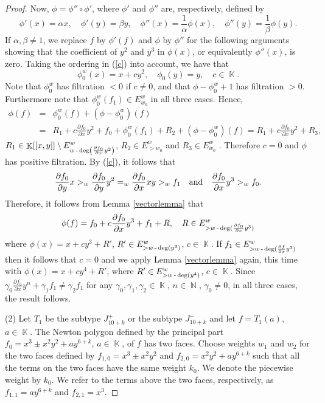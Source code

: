 \documentclass[noend]{amsproc}
\theoremstyle{definition}
\DeclareMathOperator{\N}{\mathbb{N}}
\DeclareMathOperator{\K}{\mathbb{K}}
\DeclareMathOperator{\dash}{\textnormal{-}}
\begin{document}
\begin{proof}
Now, $\phi=\phi''\circ\phi'$, where $\phi'$ and $\phi''$ are, respectively, defined by
\[\phi'(x)=\alpha x,\quad \phi'(y)=\beta y, \quad \phi''(x)=\frac{1}{\alpha}\phi(x), \quad\phi''(y)=\frac{1}{\beta}\phi(y).\]
If $\alpha,\beta\neq 1$, we replace $f$ by $\phi'(f)$ and $\phi$ by $\phi''$ for the following arguments showing that the coefficient of $y^2$ and $y^3$ in $\phi(x)$, or equivalently $\phi''(x)$, is zero. Taking the ordering in (\ref{c}) into account, we have that \[\phi_0^w(x)=x+cy^2, \quad\phi_0(y)=y,\quad c\in\K.\] Note that $\phi^w_0$ has filtration $<0$ if $c\neq 0$, and that $\phi-\phi^w_0+1$ has filtration $>0$. Furthermore note that $\phi_0^w(f_1)\in E_{w_0}^w$ in all three cases. Hence,
\begin{eqnarray*}
\phi(f)&=&\phi_0^w(f)+(\phi-\phi^w_0)(f)\\
&=& R_1+c\frac{\partial f_0}{\partial x}y^2+f_0+\phi^w_0(f_1)+R_2 +(\phi-\phi^w_0)(f)=R_1+c\frac{\partial f_0}{\partial x}y^2+R_3,
\end{eqnarray*} 
$R_1\in\K[[x,y]]\setminus E^w_{w\dash\deg\left(\frac{\partial f_0}{\partial x}y^2\right)}$, $R_2\in E^w_{>w_0}$ and $R_3\in E^w_{w_0}$ . Therefore $c=0$ and $\phi$ has positive filtration.
By (\ref{c}), it follows that
\begin{equation*}
\frac{\partial f_0}{\partial y}x >_w\frac{\partial f_0}{\partial y}y^2 =_w \frac{\partial f_0}{\partial x}xy>_w  f_1\quad\textnormal{and}\quad \frac{\partial f_0}{\partial x}y^3>_w f_0.
\end{equation*}
Therefore, it follows from Lemma \ref{vectorlemma} that
\begin{equation*}
\phi(f) = f_0+c\frac{\partial f_0}{\partial x}y^3+f_1+R,\quad R\in E^w_{>w\dash\deg(\frac{\partial f_0}{\partial x}y^3)}
\end{equation*}
where $\phi(x) = x+ cy^3+R'$, $R'\in E^w_{>w\dash\deg(y^3)}$, $c\in\K$. If $f_1\in E^w_{>w\dash\deg(\frac{\partial f}{\partial x}y^3)}$ then it follows that $c=0$ and we apply Lemma \ref{vectorlemma} again, this time with $\phi(x)=x+cy^4+R'$, where $R'\in E^w_{>w\dash\deg(y^4)}$, $c\in\K$.  Since $\gamma_0\frac{\partial f_0}{\partial x}y^n+\gamma_1f_1\neq \gamma_2f_1$ for any $\gamma_0,\gamma_1,\gamma_2\in\K$, $n\in\N$, $\gamma_0\neq 0$, in all three cases, the result follows.

(2) Let $T_1$ be the subtype $J_{10+k}^+$ or the subtype $J_{10+k}^-$ and let $f=T_1(a)$, $a\in\K$. 
The Newton polygon defined by the principal part $f_0=x^3\pm x^2y^2+ay^{6+k}$, $a\in\K$, of $f$ has two faces. Choose weights $w_1$ and $w_2$ for the two faces defined by $f_{1,0}=x^3\pm x^2y^2$ and $f_{2,0}=x^2y^2+ay^{6+k}$ such that all the terms on the two faces have the same weight $k_0$. We denote the piecewise weight by $k_0$. We refer to the terms above the two faces, respectively, as $f_{1,1}=ay^{6+k}$ and $f_{2,1}=x^3$.


\end{proof}
\end{document}
